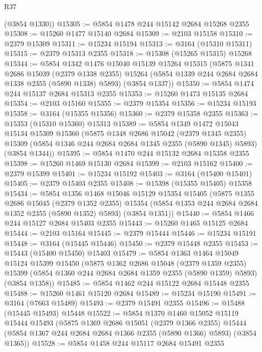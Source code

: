\begin{lexlean}{R37}
\begin{coremodule}
      (@3854 @1330))
@15305 := @5854 @1478 @244 @15142 @2684 @15268 @2355
@15308 := @15260 @1477 @15140 @2684
@15309 := @2103 @15158
@15310 := @2379 @15309
@15311 := @15234 @15194
@15313 := @3164 (@15310 @15311)
@15315 := @2379 @15313 @2355
@15318 := @15308 (@15265 @15315) @15268
@15344 := @5854
    @1342
    @1476
    @15040
    @15139
    @15264
    @15315
    (@5875
      @1341
      @2686
      @15039
      (@2379 @1338 @2355)
      @15264
      (@5854 @1339 @244 @2684 @2684 @1338 @2355 (@5890 @1338) @5893)
      (@3854 @1337))
@15350 := @5854 @1474 @244 @15137 @2684 @15313 @2355
@15353 := @15260 @1473 @15135 @2684
@15354 := @2103 @15160
@15355 := @2379 @15354
@15356 := @15234 @15193
@15358 := @3164 (@15355 @15356)
@15360 := @2379 @15358 @2355
@15363 := @15353 (@15310 @15360) @15313
@15389 := @5854
    @1349
    @1472
    @15043
    @15134
    @15309
    @15360
    (@5875
      @1348
      @2686
      @15042
      (@2379 @1345 @2355)
      @15309
      (@5854 @1346 @244 @2684 @2684 @1345 @2355 (@5890 @1345) @5893)
      (@3854 @1344))
@15395 := @5854 @1470 @244 @15132 @2684 @15358 @2355
@15398 := @15260 @1469 @15130 @2684
@15399 := @2103 @15162
@15400 := @2379 @15399
@15401 := @15234 @15192
@15403 := @3164 (@15400 @15401)
@15405 := @2379 @15403 @2355
@15408 := @15398 (@15355 @15405) @15358
@15434 := @5854
    @1356
    @1468
    @15046
    @15129
    @15354
    @15405
    (@5875
      @1355
      @2686
      @15045
      (@2379 @1352 @2355)
      @15354
      (@5854 @1353 @244 @2684 @2684 @1352 @2355 (@5890 @1352) @5893)
      (@3854 @1351))
@15440 := @5854 @1466 @244 @15127 @2684 @15403 @2355
@15443 := @15260 @1465 @15125 @2684
@15444 := @2103 @15164
@15445 := @2379 @15444
@15446 := @15234 @15191
@15448 := @3164 (@15445 @15446)
@15450 := @2379 @15448 @2355
@15453 := @15443 (@15400 @15450) @15403
@15479 := @5854
    @1363
    @1464
    @15049
    @15124
    @15399
    @15450
    (@5875
      @1362
      @2686
      @15048
      (@2379 @1359 @2355)
      @15399
      (@5854 @1360 @244 @2684 @2684 @1359 @2355 (@5890 @1359) @5893)
      (@3854 @1358))
@15485 := @5854 @1462 @244 @15122 @2684 @15448 @2355
@15488 := @15260 @1461 @15120 @2684
@15489 := @15234 @15190
@15491 := @3164 (@7663 @15489)
@15493 := @2379 @15491 @2355
@15496 := @15488 (@15445 @15493) @15448
@15522 := @5854
    @1370
    @1460
    @15052
    @15119
    @15444
    @15493
    (@5875
      @1369
      @2686
      @15051
      (@2379 @1366 @2355)
      @15444
      (@5854 @1367 @244 @2684 @2684 @1366 @2355 (@5890 @1366) @5893)
      (@3854 @1365))
@15528 := @5854 @1458 @244 @15117 @2684 @15491 @2355

\end{coremodule}
\end{lexlean}
